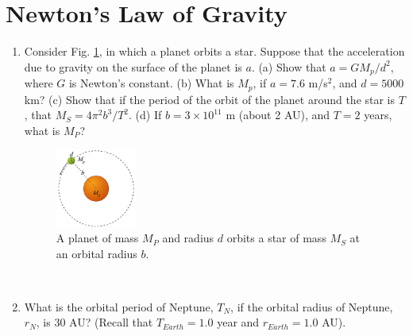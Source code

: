 \documentclass[10pt]{article}
\begin{document}
\section{Newton's Law of Gravity}
\begin{enumerate}
\item Consider Fig. \ref{fig:planet}, in which a planet orbits a star.  Suppose that the acceleration due to gravity on the surface of the planet is $a$.  (a) Show that $a = GM_p/d^2$, where $G$ is Newton's constant.  (b)  What is $M_p$, if $a=7.6$ m/s$^2$, and $d = 5000$ km? (c) Show that if the period of the orbit of the planet around the star is $T$, that $M_S = 4\pi^2 b^3/T^2$. (d) If $b = 3 \times 10^{11}$ m (about 2 AU), and $T = 2$ years, what is $M_P$?
\begin{figure}[ht]
\centering
\includegraphics[width=0.25\textwidth]{figures/planet.png}
\caption{\label{fig:planet} A planet of mass $M_P$ and radius $d$ orbits a star of mass $M_S$ at an orbital radius $b$.}
\end{figure} \\ \vspace{0.5cm}
\item What is the orbital period of Neptune, $T_N$, if the orbital radius of Neptune, $r_N$, is 30 AU? (Recall that $T_{Earth} = 1.0$ year and $r_{Earth} = 1.0$ AU). \\ \vspace{1cm}
\end{enumerate}
\end{document}
